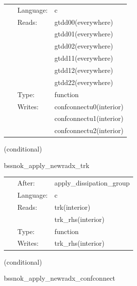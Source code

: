  \begin{tabular*}{160mm}{cll} 
~ & Language:  & c \\ 
~ & Reads:  & gtdd00(everywhere) \\ 
~& ~ &gtdd01(everywhere)\\ 
~& ~ &gtdd02(everywhere)\\ 
~& ~ &gtdd11(everywhere)\\ 
~& ~ &gtdd12(everywhere)\\ 
~& ~ &gtdd22(everywhere)\\ 
~ & Type:  & function \\ 
~ & Writes:  & confconnectu0(interior) \\ 
~& ~ &confconnectu1(interior)\\ 
~& ~ &confconnectu2(interior)\\ 
\end{tabular*} 


\vspace{5mm}

   (conditional) 

\hspace{5mm} bssnok\_apply\_newradx\_trk 



\hspace{5mm}

 \begin{tabular*}{160mm}{cll} 
~ & After:  & apply\_dissipation\_group \\ 
~ & Language:  & c \\ 
~ & Reads:  & trk(interior) \\ 
~& ~ &trk\_rhs(interior)\\ 
~ & Type:  & function \\ 
~ & Writes:  & trk\_rhs(interior) \\ 
\end{tabular*} 


\vspace{5mm}

   (conditional) 

\hspace{5mm} bssnok\_apply\_newradx\_confconnect 



